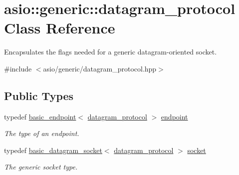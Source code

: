 \hypertarget{classasio_1_1generic_1_1datagram__protocol}{}\section{asio\+:\+:generic\+:\+:datagram\+\_\+protocol Class Reference}
\label{classasio_1_1generic_1_1datagram__protocol}


Encapsulates the flags needed for a generic datagram-\/oriented socket.  




{\ttfamily \#include $<$asio/generic/datagram\+\_\+protocol.\+hpp$>$}

\subsection*{Public Types}
\begin{DoxyCompactItemize}
\item 
typedef \hyperlink{classasio_1_1generic_1_1basic__endpoint}{basic\+\_\+endpoint}$<$ \hyperlink{classasio_1_1generic_1_1datagram__protocol}{datagram\+\_\+protocol} $>$ \hyperlink{classasio_1_1generic_1_1datagram__protocol_aa369f433faf2396705f94f287ae080b1}{endpoint}
\begin{DoxyCompactList}\small\item\em The type of an endpoint. \end{DoxyCompactList}\item 
typedef \hyperlink{classasio_1_1basic__datagram__socket}{basic\+\_\+datagram\+\_\+socket}$<$ \hyperlink{classasio_1_1generic_1_1datagram__protocol}{datagram\+\_\+protocol} $>$ \hyperlink{classasio_1_1generic_1_1datagram__protocol_ace3933da4ea5583139d643d17042b9f3}{socket}
\begin{DoxyCompactList}\small\item\em The generic socket type. \end{DoxyCompactList}\end{DoxyCompactItemize}
